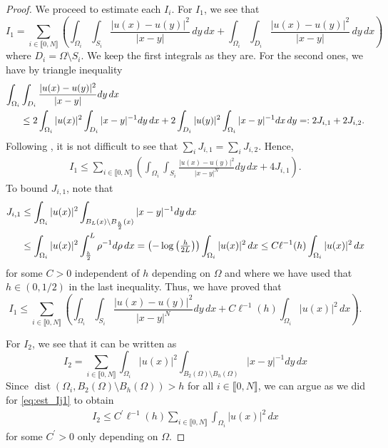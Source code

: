 \documentclass[10 pt]{article}
\newcommand\inter[1]{\llbracket #1\rrbracket}
\numberwithin{equation}{section}
\def\dist{\operatorname{dist}}
\begin{document}
\begin{proof}
We proceed to estimate each $I_i$. For $I_1$, we see that  
%
\begin{equation}
    I_1=\sum_{i\in\inter{0,N}}\left(\int_{\Omega_i}\int_{S_i}\frac{|u(x)-u(y)|^2}{|x-y|}\,dy\,dx+\int_{\Omega_i}\int_{D_i}\frac{|u(x)-u(y)|^2}{|x-y|}\,dy\,dx\right)
\end{equation}
%
where $D_i=\Omega\setminus S_i$. We keep the first integrals as they are. For the second ones, we have by triangle inequality
%
\begin{align}\notag
    \int_{\Omega_i}&\int_{D_i} \frac{|u(x)-u(y)|^2}{|x-y|}dy\,dx \\
    &\leq 2\int_{\Omega_i}|u(x)|^2\int_{D_i}|x-y|^{-1}dy\,dx+2\int_{D_i}|u(y)|^2\int_{\Omega_i}|x-y|^{-1}dx\,dy=:2J_{i,1}+2J_{i,2}.
\end{align}
%
Following \cite[Prop. 1.2.24]{Bor17}, it is not difficult to see that $\sum_{i}{J_{i,1}}=\sum_{i}{J_{i,2}}$. Hence,
%
\begin{align}\label{eq:est_I1}
    I_1\leq \sum_{i\in\inter{0,N}}\left(\int_{\Omega_i}\int_{S_i}\frac{|u(x)-u(y)|^2}{|x-y|^N}dy\,dx+4 J_{i,1}\right).
\end{align}
%
To bound $J_{i,1}$, note that
%
\begin{align}\notag
    J_{i,1}&\leq \int_{\Omega_i}|u(x)|^2\int_{B_{L}(x)\setminus B_{\frac{h}{2}}(x)}|x-y|^{-1}dy\,dx \\\label{eq:est_Ij1}
    &\leq \int_{\Omega_i}|u(x)|^2\int_{\frac{h}{2}}^{L}\rho^{-1}d\rho\,dx=\left(-\log\left(\tfrac{h}{2L}\right)\right)\int_{\Omega_i}|u(x)|^2\,dx\leq C\ell^{-1} (h)\int_{\Omega_i}|u(x)|^2\,dx
\end{align}
%
for some $C>0$ independent of $h$ depending on $\Omega$ and where we have used that $h\in(0,1/2)$ in the last inequality. Thus, we have proved that
%
\begin{equation}\label{eq:est_I1_final}
    I_1\leq \sum_{i\in\inter{0,N}}\left(\int_{\Omega_i}\int_{S_i}\frac{|u(x)-u(y)|^2}{|x-y|^N}dy\,dx + C\ell^{-1}(h)\int_{\Omega_i}|u(x)|^2\,dx\right).
\end{equation}
%

For $I_2$, we see that it can be written as
%
\begin{equation}
    I_2=\sum_{i\in\inter{0,N}}\int_{\Omega_i}|u(x)|^2\int_{B_2(\Omega)\setminus B_{h}(\Omega)}|x-y|^{-1}dy\,dx
\end{equation}
%
Since $\dist(\Omega_i,B_2(\Omega)\setminus B_h(\Omega))>h$ for all $i\in\inter{0,N}$, we can argue as we did for \eqref{eq:est_Ij1} to obtain 
%
\begin{align}\label{eq:est_I2}
    I_2\leq C^\prime\ell^{-1}(h)\sum_{i\in\inter{0,N}}\int_{\Omega_i}|u(x)|^2\,dx
\end{align}
%
for some $C^\prime>0$ only depending on $\Omega$.


\end{proof}
\end{document}
